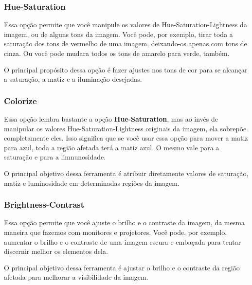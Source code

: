 \documentclass[12pt,onecolumn]{article}
\begin{document}
      \subsubsection{Hue-Saturation}
        Essa opção permite que você manipule os valores de
        Hue-Saturation-Lightness da imagem, ou de alguns tons da imagem. Você
        pode, por exemplo, tirar toda a saturação dos tons de vermelho de uma
        imagem, deixando-os apenas com tons de cinza. Ou você pode mudara todos
        os tons de amarelo para verde, também.
        
        O principal propósito dessa opção é fazer ajustes nos tons de cor para
        se alcançar a saturação, a matiz e a iluminação desejadas.
      
      \subsubsection{Colorize}
        Essa opção lembra bastante a opção \textbf{Hue-Saturation}, mas ao invés
        de manipular os valores Hue-Saturation-Lightness originais da imagem,
        ela sobrepõe completamente eles. Isso significa que se você usar essa
        opção para mover a matiz para azul, toda a região afetada terá a matiz
        azul. O mesmo vale para a saturação e para a limnunosidade.
        
        O principal objetivo dessa ferramenta é atribuir diretamente valores de
        saturação, matiz e luminosidade em determinadas regiões da imagem.
      
      \subsubsection{Brightness-Contrast}
        Essa opção permite que você ajuste o brilho e o contraste da imagem, da
        mesma maneira que fazemos com monitores e projetores. Você pode, por
        exemplo, aumentar o brilho e o contraste de uma imagem escura e embaçada
        para tentar discernir melhor os elementos dela.
        
        O principal objetivo dessa ferramenta é ajustar o brilho e o contraste
        da região afetada para melhorar a visibilidade da imagem.
\end{document}
